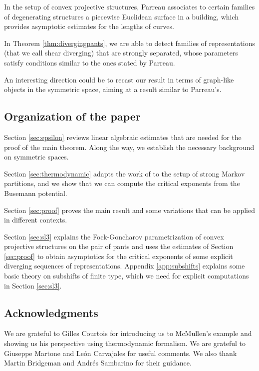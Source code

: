 \documentclass{amsart}
\theoremstyle{remark}
\theoremstyle{definition}
\begin{document}
In the setup of convex projective structures, Parreau \cite{parreau2015invariant} associates to certain families of degenerating structures a piecewise Euclidean surface in a building, which provides asymptotic estimates for the lengths of curves.

In Theorem \ref{thm:divergingpants}, we are able to detect families of representations (that we call shear diverging) that are strongly separated, whose parameters satisfy conditions similar to the ones stated by Parreau.

An interesting direction could be to recast our result in terms of graph-like objects in the symmetric space, aiming at a result similar to Parreau's.


\subsection{Organization of the paper}

 Section \ref{sec:epsilon} reviews linear algebraic estimates that are needed for the proof of the main theorem. Along the way, we establish the necessary background on symmetric spaces. 

Section \ref{sec:thermodynamic} adapts the work of \cite{bochi2019anosov} to the setup of strong Markov partitions, and we show that we can compute the critical exponents from the Busemann potential.

 Section \ref{sec:proof} proves the main result and some variations that can be applied in different contexts.

Section \ref{sec:sl3} explains the Fock-Goncharov parametrization of convex projective structures on the pair of pants and uses the estimates of Section \ref{sec:proof} to obtain asymptotics for the critical exponents of some explicit diverging sequences of representations.
 Appendix \ref{app:subshifts} explains some basic theory on subshifts of finite type, which we need for explicit computations in Section \ref{sec:sl3}.

\subsection*{Acknowledgments}
We are grateful to Gilles Courtois for introducing us to McMullen's example and showing us his perspective using thermodynamic formalism. We are grateful to Giuseppe Martone and Le\'{o}n Carvajales for useful comments. We also thank Martin Bridgeman and Andr\'es Sambarino for their guidance.
\end{document}
